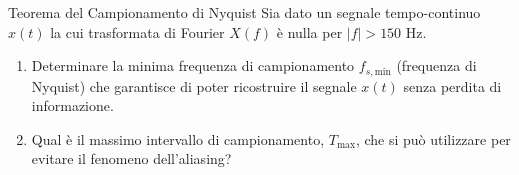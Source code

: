 
\begin{esercizio}{Teorema del Campionamento di Nyquist}
    Sia dato un segnale tempo-continuo $x(t)$ la cui trasformata di Fourier $X(f)$ è nulla per $|f| > 150 \text{ Hz}$.
    
    \begin{enumerate}
        \item Determinare la minima frequenza di campionamento $f_{s, \text{min}}$ (frequenza di Nyquist) che garantisce di poter ricostruire il segnale $x(t)$ senza perdita di informazione.
        \item Qual è il massimo intervallo di campionamento, $T_{\text{max}}$, che si può utilizzare per evitare il fenomeno dell'aliasing?
    \end{enumerate}
\end{esercizio}